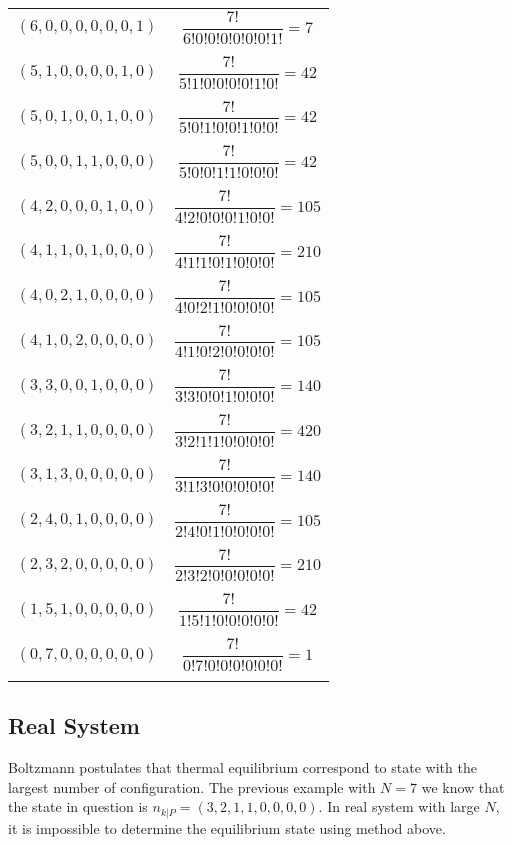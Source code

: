 \documentclass[../../../Main.tex]{subfiles}
\begin{document}
\begin{longtable}{c||c}
    $(6, 0, 0, 0, 0, 0, 0, 1)$&$\dfrac{7!}{6!0!0!0!0!0!0!1!} =7 $\\\\
    $(5, 1, 0, 0, 0, 0, 1, 0)$&$\dfrac{7!}{5!1!0!0!0!0!1!0!} =42 $\\\\
    $(5, 0, 1, 0, 0, 1, 0, 0)$&$\dfrac{7!}{5!0!1!0!0!1!0!0!} =42$\\\\
    $(5, 0, 0, 1, 1, 0, 0, 0)$&$\dfrac{7!}{5!0!0!1!1!0!0!0!} =42 $\\\\
    $(4, 2, 0, 0, 0, 1, 0, 0)$&$\dfrac{7!}{4!2!0!0!0!1!0!0!} =105$\\\\
    $(4, 1, 1, 0, 1, 0, 0, 0)$&$\dfrac{7!}{4!1!1!0!1!0!0!0!} =210 $\\\\
    $(4, 0, 2, 1, 0, 0, 0, 0)$&$\dfrac{7!}{4!0!2!1!0!0!0!0!} =105 $\\\\
    $(4, 1, 0, 2, 0, 0, 0, 0)$&$\dfrac{7!}{4!1!0!2!0!0!0!0!} =105 $\\\\
    $(3, 3, 0, 0, 1, 0, 0, 0)$&$\dfrac{7!}{3!3!0!0!1!0!0!0!} =140 $\\\\
    $(3, 2, 1, 1, 0, 0, 0, 0)$&$\dfrac{7!}{ 3!2!1!1!0!0!0!0!} =420 $\\\\
    $(3, 1, 3, 0, 0, 0, 0, 0)$&$\dfrac{7!}{3!1!3!0!0!0!0!0!} =140 $\\\\
    $(2, 4, 0, 1, 0, 0, 0, 0)$&$\dfrac{7!}{2!4!0!1!0!0!0!0!} =105 $\\\\
    $(2, 3, 2, 0, 0, 0, 0, 0)$&$\dfrac{7!}{2!3!2!0!0!0!0!0!} =210 $\\\\
    $(1, 5, 1, 0, 0, 0, 0, 0)$&$\dfrac{7!}{1!5!1!0!0!0!0!0!} =42 $\\\\
    $(0, 7, 0, 0, 0, 0, 0, 0)$&$\dfrac{7!}{0!7!0!0!0!0!0!0!} =1 $\\\\
\end{longtable}

\subsection*{ Real\textsuperscript{\texttrademark} System}
Boltzmann postulates that thermal equilibrium correspond to state with the largest number of configuration. The previous example with $N=7$ we know that the state in question is $n_{k|P}=(3, 2, 1, 1, 0, 0, 0, 0)$. In real system with large $N$, it is impossible to determine the equilibrium state using method above.
\end{document}
